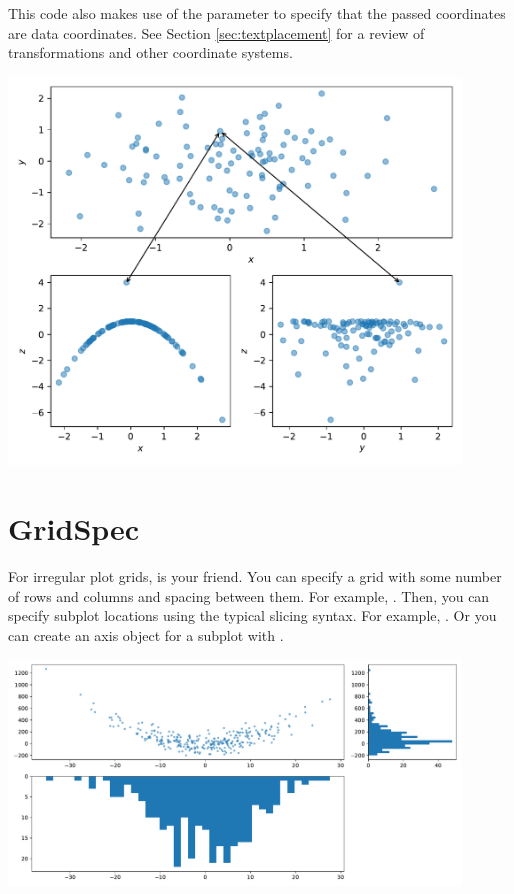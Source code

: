 This code also makes use of the  parameter to specify that the passed coordinates are data coordinates. See Section \ref{sec:textplacement} for a review of transformations and other coordinate systems. 


\begin{center}
    \includegraphics[width = 0.9\textwidth]{figures/proseplots/connect-path.pdf}
\end{center}



\section{GridSpec}


For irregular plot grids,  is your friend. You can specify a grid with some number of rows and columns and spacing between them. For example, . Then, you can specify subplot locations using the typical slicing syntax. For example, . Or you can create an axis object for a subplot with .


\begin{center}
    \includegraphics[width = 0.9\textwidth]{figures/proseplots/gridspec.pdf}
\end{center}


